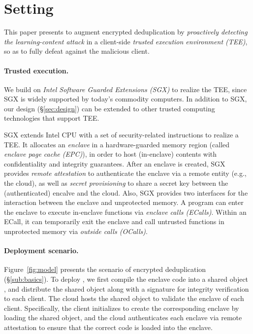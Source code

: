 \section{Setting}
\label{sec:setting}


This paper presents \sysnameF to augment encrypted deduplication by {\em proactively detecting the learning-content attack} in a client-side {\em trusted execution environment (TEE)}, so as to fully defeat against the malicious client.

\paragraph{Trusted execution.} We build on {\em Intel Software Guarded Extensions (SGX)} \cite{sgx} to realize the TEE, since SGX is widely supported by today's commodity computers. In addition to SGX, our design (\S\ref{sec:design}) can be extended to other trusted computing technologies \cite{amd-sev, pinto19} that support TEE.

SGX extends Intel CPU with a set of security-related instructions to realize a TEE. It allocates an {\em enclave} in a hardware-guarded memory region (called {\em enclave page cache (EPC)}), in order to host (in-enclave) contents with confidentiality and integrity guarantees. After an enclave is created, SGX provides {\em remote attestation} to authenticate the enclave via a remote entity (e.g., the cloud), as well as {\em secret provisioning} to share a secret key between the (authenticated) encalve and the cloud. Also, SGX provides two interfaces for the interaction between the enclave and  unprotected memory. A program can enter the enclave to execute in-enclave functions via {\em enclave calls (ECalls)}. Within an ECall, it can temporarily exit the enclave and call untrusted functions in unprotected memory via {\em outside calls (OCalls)}.



\paragraph{Deployment scenario.} Figure~\ref{fig:model} presents the scenario of encrypted deduplication (\S\ref{sub:basics}). To deploy \sysnameF, we first compile the enclave code into a shared object \cite{sgx}, and distribute the shared object along with a signature for integrity verification to each client. The cloud  hosts the shared object to validate the enclave of each client.
Specifically, the client initializes \sysnameF to create the corresponding enclave by loading the shared object, and the cloud authenticates each enclave via remote attestation \cite{sgx} to ensure that the correct code is loaded into the enclave.

